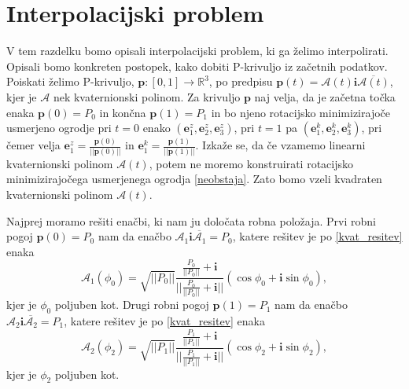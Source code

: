 \documentclass[mat1]{fmfdelo}
\newcommand{\R}{\mathbb R}
\newcommand{\ii}{\boldsymbol i}
\newcommand{\pp}{\boldsymbol p}
\newcommand{\e}{\boldsymbol e}
\newcommand{\oo}{\boldsymbol o}
\newcommand{\uu}{\boldsymbol u}
\newcommand{\vv}{\boldsymbol v}
\newcommand{\A}{\mathcal A}
\begin{document}
\fi





\iffalse 

Ko sestavimo vse stvari skupaj, opišemo naš postopek z naslednjim algoritmom.\\
\textbf{Vhodni podatki:} začetna točka $\pp_z = d_z \oo_z$, končna točka $\pp_k = d_k \oo_k$, usmerjenost končnih točk $\left( \oo_z, \uu_z, \vv_z\right)$,  $\left( \oo_k, \uu_k, \vv_k\right)$, $\oo_z != \oo_k$.
\begin{enumerate}
	\item a
	\item b
\end{enumerate}
\fi

\section{Interpolacijski problem}{\label{int_problem}}
V tem razdelku bomo opisali interpolacijski problem, ki ga želimo interpolirati.
Opisali bomo konkreten postopek, kako dobiti P-krivuljo iz začetnih podatkov. 
 Poiskati želimo P-krivuljo, $\pp:\left[0,1\right] \rightarrow \R^3$, po predpisu $\pp(t) = \A(t)\ii\overline{\A(t)}$, kjer je $\A$ nek kvaternionski polinom. Za krivuljo $\pp$ naj velja, da je začetna točka enaka $\pp(0) = P_0$ in končna $\pp(1)=P_1$ in bo njeno rotacijsko minimizirajoče usmerjeno ogrodje pri $t=0$ enako $\left( \e_1^{z},\e_2^{z},\e_3^{z} \right)$, pri $t=1$ pa $\left( \e_1^{k},\e_2^{k},\e_3^{k} \right)$, pri čemer velja $\e_1^{z}= \frac{\pp(0)}{||\pp(0)||}$ in $\e_1^{k}= \frac{\pp(1)}{||\pp(1)||}$. Izkaže se, da če vzamemo linearni kvaternionski polinom $\A(t)$, potem ne moremo konstruirati rotacijsko minimizirajočega usmerjenega ogrodja \ref{neobstaja}. Zato bomo vzeli kvadraten kvaternionski polinom $\A(t)$.

	Najprej moramo rešiti enačbi, ki nam ju določata robna položaja.
	Prvi robni pogoj $\pp(0) = P_0$ nam da enačbo $\A_1 \ii \overline{\A_1} = P_0$, katere rešitev je po \ref{kvat_resitev} enaka 
	\begin{equation}
		\A_1(\phi_0) = \sqrt{||P_0||} \frac{\frac{P_0}{||P_0||}+\ii}{||\frac{P_0}{||P_0||}+\ii||} \left( \cos \phi_0 + \ii \sin \phi_0 \right),
	\end{equation}
	kjer je $\phi_0$ poljuben kot.
	Drugi robni pogoj $\pp(1) = P_1$ nam da enačbo $\A_2 \ii \overline{\A_2} = P_1$, katere rešitev je po \ref{kvat_resitev} enaka 
	\begin{equation}
	\A_2(\phi_2) = \sqrt{||P_1||} \frac{\frac{P_1}{||P_1||}+\ii}{||\frac{P_1}{||P_1||}+\ii||} \left( \cos \phi_2 + \ii \sin \phi_2 \right),
	\end{equation}
	kjer je $\phi_2$ poljuben kot.
	
\end{document}
